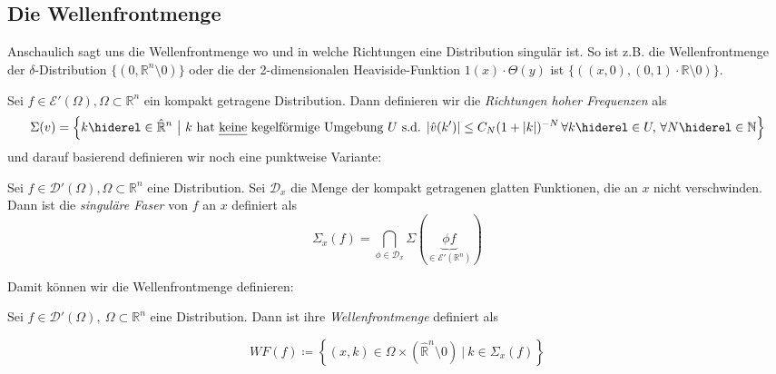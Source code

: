 \subsection{Die Wellenfrontmenge}
\label{sec:wavefrontset}

Anschaulich sagt uns die Wellenfrontmenge wo und in welche Richtungen eine Distribution singulär ist. So ist z.B. die Wellenfrontmenge der $\delta$-Distribution $\{(0, \mathbb{R}^n \setminus 0)\}$ oder die der 2-dimensionalen Heaviside-Funktion $1(x)\cdot\Theta(y)$ ist $\{((x,0),(0,1)\cdot \mathbb{R}\setminus 0)\}$.

\begin{definition}
\label{def:high_frequency_set}
Sei $f \in \mathcal{E}'(\Omega), \Omega \subset \mathbb{R}^n$ ein kompakt getragene Distribution. Dann definieren wir die \emph{Richtungen hoher Frequenzen} als
\begin{dmath*}
\Sigma (v) = \left\{k \hiderel \in \hat{\mathbb{R}}^n ~\big|~ k \textrm{ hat \emph{keine} kegelförmige Umgebung $U$ s.d. } \\ |\hat v (k')| \leq C_N(1+|k|)^{-N} \, \forall k \hiderel\in U,\, \forall N  \hiderel\in \mathbb{N} \right\}
\end{dmath*}
und darauf basierend definieren wir noch eine punktweise Variante:

Sei $f \in \mathcal{D}'(\Omega), \Omega \subset \mathbb{R}^n$ eine Distribution.
Sei $\mathcal{D}_x$ die Menge der kompakt getragenen glatten Funktionen, die an $x$ nicht verschwinden.
Dann ist die \emph{singuläre Faser} von $f$ an $x$ definiert als
\begin{dmath*}
\Sigma_x (f) = \bigcap \limits_{\phi \in \mathcal{D}_x} \Sigma (\underbrace{\phi f}_{\in \mathcal{E}'(\mathbb{R}^n)})
\end{dmath*}
\end{definition}

Damit können wir die Wellenfrontmenge definieren:

\begin{definition}[Wellenfrontmenge]
\label{def:wavefrontset}
Sei $f \in \mathcal{D}'(\Omega), ~\Omega \subset \mathbb{R}^n$ eine Distribution. Dann ist ihre \emph{Wellenfrontmenge} definiert als

\begin{equation*}
WF(f)  \coloneqq \left\{
	(x,k) \in \Omega \times (\hat{\mathbb{R}}^n \setminus 0)
	~\Big|~ k \in \Sigma_x(f)
	\right\}
\end{equation*}
\end{definition}

